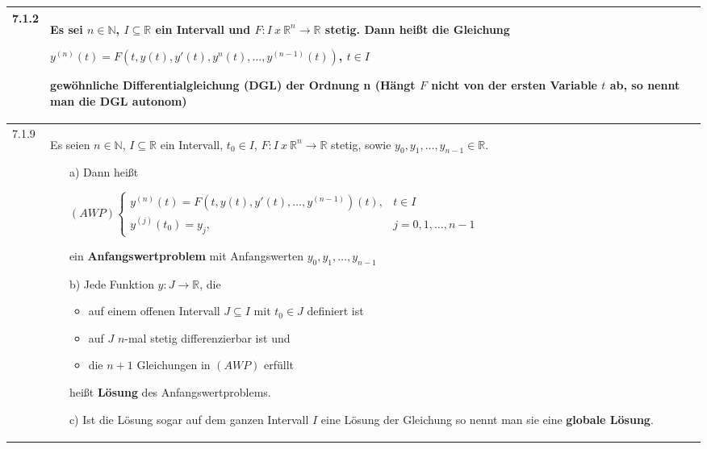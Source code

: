     \begin{longtable}{p{1cm} p{16cm}}
        \toprule

        7.1.2 & Es sei $n \in \mathbb{N}$, $I \subseteq \mathbb{R}$ ein Intervall und $F: I~x~\mathbb{R}^n \rightarrow \mathbb{R}$ stetig.
                Dann heißt die Gleichung \hfill \break
                \centerline{$ y^{(n)}(t) = F(t,y(t), y'(t), y^n(t), \dots, y^{(n-1)}(t))$, $t\in I$} 
                \textbf{gewöhnliche Differentialgleichung (DGL) der Ordnung n} \hfill \break
                (Hängt $F$ nicht von der ersten Variable $t$ ab, so nennt man die DGL \textbf{autonom}) \\
        \midrule
        7.1.9 & Es seien $n \in \mathbb{N}$, $I \subseteq \mathbb{R}$ ein Intervall, $t_0 \in I$, $F:I ~x~ \mathbb{R}^n \rightarrow \mathbb{R}$
                stetig, sowie $y_0, y_1, \dots, y_{n-1} \in \mathbb{R}$.
                \begin{itemize}[topsep=-0.5cm]
                    \item[a)] Dann heißt \hfill \break
                                \centerline{$ (AWP) \begin{cases}
                                                    y^{(n)}(t) = F(t,y(t),y'(t), \dots, y^{(n-1)})(t), & t \in I \\
                                                    y^{(j)}(t_0) = y_j, & j = 0,1,\dots, n-1
                                                    \end{cases} $}
                                ein \textbf{Anfangswertproblem} mit Anfangswerten $y_0,y_1, \dots, y_{n-1}$ 
                    \item[b)] Jede Funktion $y: J \rightarrow \mathbb{R}$, die 
                                \begin{itemize}
                                    \item auf einem offenen Intervall $J \subseteq I$ mit $t_0 \in J$ definiert ist
                                    \item auf $J$ $n$-mal stetig differenzierbar ist und
                                    \item die $n+1$ Gleichungen in $(AWP)$ erfüllt
                                \end{itemize}
                              heißt \textbf{Lösung} des Anfangswertproblems.
                    \item[c)] Ist die Lösung sogar auf dem ganzen Intervall $I$ eine Lösung der Gleichung so nennt man sie eine
                                \textbf{globale Lösung}.
                \end{itemize} \vspace{-0cm} \\

        \bottomrule

    \end{longtable}
    


